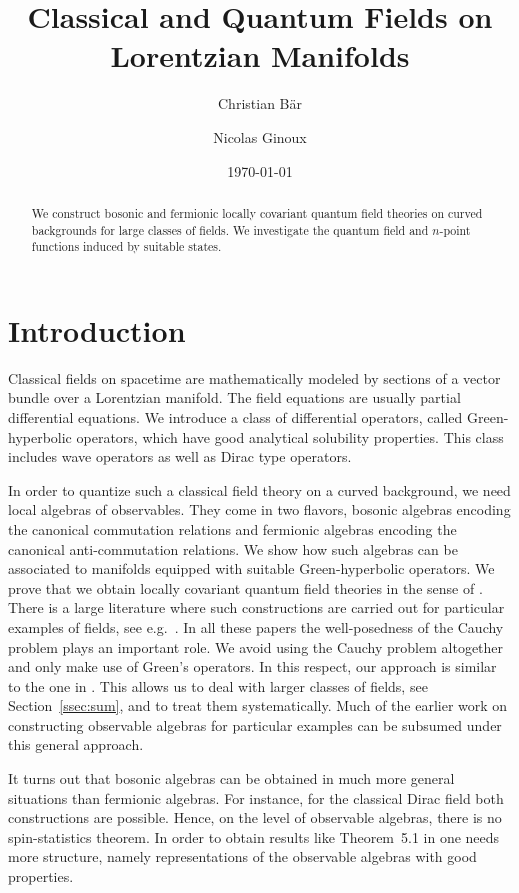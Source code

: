 \documentclass[a4paper,11pt]{amsart}
\title{Classical and Quantum Fields on Lorentzian Manifolds}
\author{Christian B\"ar}
\author{Nicolas Ginoux}
\date{\today}
\theoremstyle{definition}
\begin{document}
\begin{abstract}
We construct bosonic and fermionic locally covariant quantum field theories on curved backgrounds for large classes of fields.
We investigate the quantum field and $n$-point functions induced by suitable states.
\end{abstract}

\maketitle

\section{Introduction}
Classical fields on spacetime are mathematically modeled by sections of a vector bundle over a Lorentzian manifold.
The field equations are usually partial differential equations.
We introduce a class of differential operators,  called Green-hyperbolic operators, which have good analytical solubility properties.
This class includes wave operators as well as Dirac type operators.

In order to quantize such a classical field theory on a curved background, we need local algebras of observables.
They come in two flavors, bosonic algebras encoding the canonical commutation relations and fermionic algebras encoding the canonical anti-commutation relations.
We show how such algebras can be associated to manifolds equipped with suitable Green-hyperbolic operators.
We prove that we obtain locally covariant quantum field theories in the sense of \cite{BFV}.
There is a large literature where such constructions are carried out for particular examples of fields, see e.g.\ \cite{DHP,Dimock80,Dimock82,Furlani,Kay78,S}.
In all these papers the well-posedness of the Cauchy problem plays an important role.
We avoid using the Cauchy problem altogether and only make use of Green's operators.
In this respect, our approach is similar to the one in \cite{St}.
This allows us to deal with larger classes of fields, see Section~\ref{ssec:sum}, and to treat them systematically.
Much of the earlier work on constructing observable algebras for particular examples can be subsumed under this general approach.

It turns out that bosonic algebras can be obtained in much more general situations than fermionic algebras.
For instance, for the classical Dirac field both constructions are possible.
Hence, on the level of observable algebras, there is no spin-statistics theorem.
In order to obtain results like Theorem~5.1 in \cite{V} one needs more structure, namely representations of the observable algebras with good properties.
\end{document}
